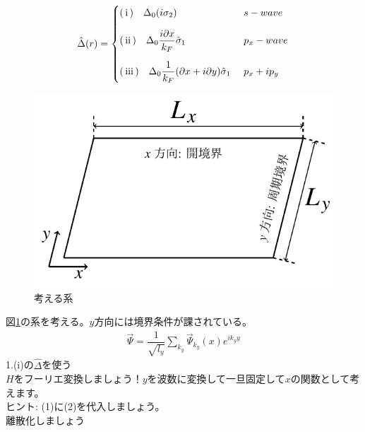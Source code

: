 \documentclass{jarticle}
\begin{document}
\begin{align}
\hat{\Delta}(r)=
\begin{cases}
$\rm(\hspace{.18em}i\hspace{.18em})\quad$\Delta_0(i\sigma_2)
& s-wave
\vspace*{1em}\\
$\rm(\hspace{.18em}ii\hspace{.18em})$\quad\Delta_0\dfrac{i\partial x}{k_F}\hat\sigma_1
&p_x-wave
\vspace*{1em}\\
$\rm(\hspace{.18em}iii\hspace{.18em})$\quad\Delta_0\dfrac{1}{k_F}(\partial x+i\partial y)\hat\sigma_1\
&p_x+ip_y
\end{cases}
\label{delta}
\end{align}
\begin{figure}[H]
	\centering
	\includegraphics[scale=1]{./figure_fix.pdf}
	\caption{考える系}
	\label{system}
\end{figure}
図\ref{system}の系を考える。$y$方向には境界条件が課されている。
\begin{align}
 \vec{\Psi}=\dfrac{1}{\sqrt{l_y}}\displaystyle\sum_{k_y}\vec{\Psi}_{k_y}(x)e^{ik_yy}
\end{align}
1.(i)の$\hat{\Delta}$を使う\\
$H$をフーリエ変換しましょう！$y$を波数に変換して一旦固定して$x$の関数として考えます。
\\ ヒント: (1)に(2)を代入しましょう。\\
離散化しましょう\\
\end{document}
